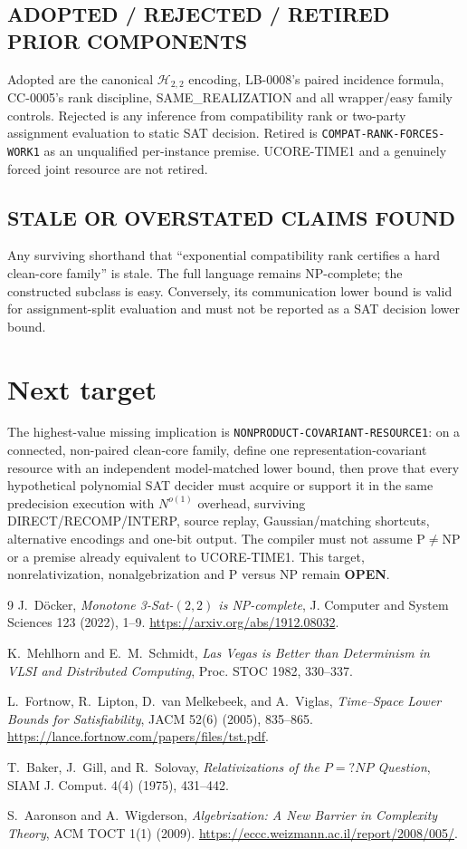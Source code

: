 \documentclass[11pt]{article}
\newcommand{\Htwo}{\mathcal H_{2,2}}
\newcommand{\OPEN}{\textbf{OPEN}}
\begin{document}
\subsection*{ADOPTED / REJECTED / RETIRED PRIOR COMPONENTS}
Adopted are the canonical $\Htwo$ encoding, LB-0008's paired incidence
formula, CC-0005's rank discipline, SAME\_REALIZATION and all wrapper/easy
family controls.  Rejected is any inference from compatibility rank or
two-party assignment evaluation to static SAT decision.  Retired is
\texttt{COMPAT-RANK-FORCES-WORK1} as an unqualified per-instance premise.
UCORE-TIME1 and a genuinely forced joint resource are not retired.

\subsection*{STALE OR OVERSTATED CLAIMS FOUND}
Any surviving shorthand that ``exponential compatibility rank certifies a
hard clean-core family'' is stale.  The full language remains NP-complete;
the constructed subclass is easy.  Conversely, its communication lower
bound is valid for assignment-split evaluation and must not be reported as a
SAT decision lower bound.

\section{Next target}

The highest-value missing implication is
\texttt{NONPRODUCT-COVARIANT-RESOURCE1}: on a connected, non-paired
clean-core family, define one representation-covariant resource with an
independent model-matched lower bound, then prove that every hypothetical
polynomial SAT decider must acquire or support it in the same predecision
execution with $N^{o(1)}$ overhead, surviving DIRECT/RECOMP/INTERP, source
replay, Gaussian/matching shortcuts, alternative encodings and one-bit
output.  The compiler must not assume P$\ne$NP or a premise already equivalent
to UCORE-TIME1.  This target, nonrelativization, nonalgebrization and P versus
NP remain \OPEN.

\begin{thebibliography}{9}
J.~D\"ocker, \emph{Monotone 3-Sat-$(2,2)$ is NP-complete},
J. Computer and System Sciences 123 (2022), 1--9.
\url{https://arxiv.org/abs/1912.08032}.

K.~Mehlhorn and E.~M.~Schmidt,
\emph{Las Vegas is Better than Determinism in VLSI and Distributed
Computing}, Proc. STOC 1982, 330--337.

L.~Fortnow, R.~Lipton, D.~van Melkebeek, and A.~Viglas,
\emph{Time--Space Lower Bounds for Satisfiability}, JACM 52(6) (2005),
835--865. \url{https://lance.fortnow.com/papers/files/tst.pdf}.

T.~Baker, J.~Gill, and R.~Solovay,
\emph{Relativizations of the $P=?NP$ Question}, SIAM J. Comput. 4(4)
(1975), 431--442.

S.~Aaronson and A.~Wigderson,
\emph{Algebrization: A New Barrier in Complexity Theory}, ACM TOCT 1(1)
(2009). \url{https://eccc.weizmann.ac.il/report/2008/005/}.
\end{thebibliography}
\end{document}
